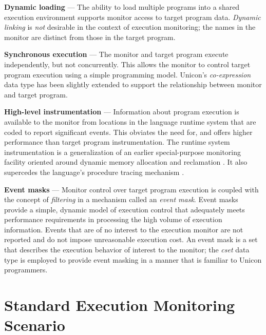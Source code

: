 \begin{list}{}{\itemsep 7pt}
\item [{\bf Dynamic loading}] --- The ability to load multiple programs
	into a shared execution environment supports
	monitor access to target program data.
	{\em Dynamic linking\/} is {\em not\/} desirable in the
	context of execution monitoring; the names in the
	monitor are distinct from those in the target program. 
\item [{\bf Synchronous execution}] --- The monitor and target program execute
	independently, but not concurrently.  This allows the monitor
	to control target program execution using a simple programming model.
	Unicon's {\em co-expression\/} data type has been
	slightly extended to support the
	relationship between monitor and target program.
\item [{\bf High-level instrumentation}] --- Information
	about program execution is available to the monitor from
	locations in the language runtime system that are coded to report
	significant events.  This obviates the need for, and
	offers higher performance than target program
	instrumentation.  The runtime system instrumentation is a
	generalization of an earlier special-purpose
	monitoring facility oriented around dynamic memory allocation
	and reclamation \cite{Townsend89}.
	It also supercedes the language's procedure
	tracing mechanism \cite{Griswold97}.
\item [{\bf Event masks}] --- Monitor control over target program
	execution is coupled with the concept of {\em filtering\/}
	\cite{Elshoff89} in a mechanism called an {\em event mask\/}.
	Event masks provide a simple, dynamic model of execution
	control that adequately meets performance requirements in
	processing the high volume of execution information.
	Events that are of no interest to the execution
	monitor are not reported and do not impose unreasonable
	execution cost. An event mask is a set that
	describes the execution behavior of interest to the monitor;
	the {\em cset} data type is employed to provide event masking
	in a manner that is familiar to Unicon programmers.
\end{list}


\section{Standard Execution Monitoring Scenario}

